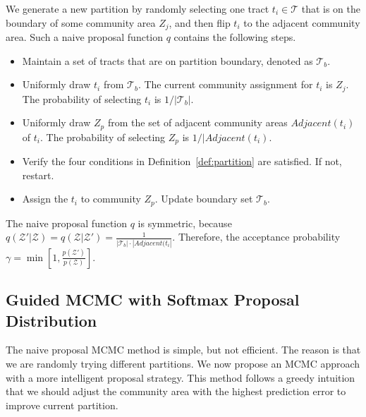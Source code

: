 We generate a new partition by randomly selecting one tract $t_i \in \mathcal{T}$ that is on the boundary of some community area $Z_j$, and then flip $t_i$ to the adjacent community area. Such a naive proposal function $q$ contains the following steps.
\begin{itemize}
  \item Maintain a set of tracts that are on partition boundary, denoted as $\mathcal{T}_b$.
  \item Uniformly draw $t_i$ from $\mathcal{T}_b$. The current community assignment for $t_i$ is $Z_j$. The probability of selecting $t_i$ is $1/|\mathcal{T}_b|$.
  \item Uniformly draw $Z_p$ from the set of adjacent community areas $Adjacent(t_i)$ of $t_i$. The probability of selecting $Z_p$ is $1/|Adjacent(t_i)$.
  \item Verify the four conditions in Definition~\ref{def:partition} are satisfied. If not, restart.
  \item Assign the $t_i$ to community $Z_p$. Update boundary set $\mathcal{T}_b$.
\end{itemize}

The naive proposal function $q$ is symmetric, because $q(\mathcal{Z}'|\mathcal{Z})=  q(\mathcal{Z}|\mathcal{Z}') = \frac{1}{|\mathcal{T}_b| \cdot |Adjacent(t_i|}$. Therefore, the acceptance probability $\gamma = \min[ 1, \frac{p(\mathcal{Z}')}{p(\mathcal{Z})}]$. 


\subsection{Guided MCMC with Softmax Proposal Distribution}

The naive proposal MCMC method is simple, but not efficient. The reason is that we are randomly trying different partitions. We now propose an MCMC approach with a more intelligent proposal strategy. This method follows a greedy intuition that we should adjust the community area with the highest prediction error to improve current partition.


